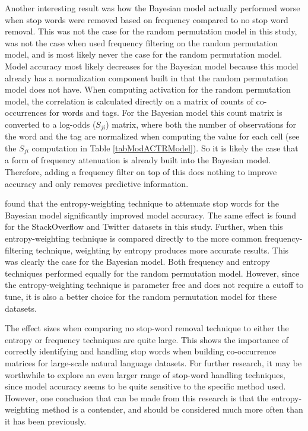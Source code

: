 \documentclass[man,floatsintext,donotrepeattitle]{apa6}
\begin{document}
Another interesting result was how the Bayesian model actually performed worse when stop words were removed based on frequency compared to no stop word removal.
This was not the case for the random permutation model in this study, was not the case when \textcite{Sahlgren2008} used frequency filtering on the random permutation model,
and is most likely never the case for the random permutation model.
Model accuracy most likely decreases for the Bayesian model because this model already has a normalization component built in that the random permutation model does not have.
When computing activation for the random permutation model, the correlation is calculated directly on a matrix of counts of co-occurrences for words and tags.
For the Bayesian model this count matrix is converted to a log-odds ($S_{ji}$) matrix,
where both the number of observations for the word and the tag are normalized when computing the value for each cell (see the $S_{ji}$ computation in Table \ref{tabModACTRModel}).
So it is likely the case that a form of frequency attenuation is already built into the Bayesian model.
Therefore, adding a frequency filter on top of this does nothing to improve accuracy and only removes predictive information.

\textcite{Stanley2013} found that the entropy-weighting technique to attenuate stop words for the Bayesian model significantly improved model accuracy.
The same effect is found for the StackOverflow and Twitter datasets in this study.
Further, when this entropy-weighting technique is compared directly to the more common frequency-filtering technique, weighting by entropy produces more accurate results.
This was clearly the case for the Bayesian model.
Both frequency and entropy techniques performed equally for the random permutation model.
However, since the entropy-weighting technique is parameter free and does not require a cutoff to tune, it is also a better choice for the random permutation model for these datasets.

The effect sizes when comparing no stop-word removal technique to either the entropy or frequency techniques are quite large.
This shows the importance of correctly identifying and handling stop words when building co-occurrence matrices for large-scale natural language datasets.
For further research, it may be worthwhile to explore an even larger range of stop-word handling techniques,
since model accuracy seems to be quite sensitive to the specific method used. 
However, one conclusion that can be made from this research is that the entropy-weighting method is a contender, and should be considered much more often than it has been previously.
\end{document}
